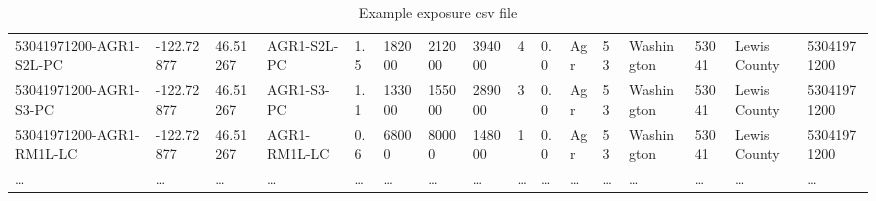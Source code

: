 \begin{table}[htbp]
{\begin{tabular}{llllllllllllllll}
53041971200-AGR1-S2L-PC  & -122.72877   & 46.51267     & AGR1-S2L-PC       & 1.5             & 182000              & 212000                 & 394000            & 4             & 0.0            & Agr                & 53                 & Washington     & 53041               & Lewis County    & 53041971200    \\
53041971200-AGR1-S3-PC   & -122.72877   & 46.51267     & AGR1-S3-PC        & 1.1             & 133000              & 155000                 & 289000            & 3             & 0.0            & Agr                & 53                 & Washington     & 53041               & Lewis County    & 53041971200    \\
53041971200-AGR1-RM1L-LC & -122.72877   & 46.51267     & AGR1-RM1L-LC      & 0.6             & 68000               & 80000                  & 148000            & 1             & 0.0            & Agr                & 53                 & Washington     & 53041               & Lewis County    & 53041971200    \\ \hline
\dots & \dots & \dots & \dots & \dots & \dots & \dots & \dots & \dots & \dots & \dots & \dots & \dots & \dots & \dots & \dots \\
\hline

\end{tabular}
}
\caption{Example exposure csv file}
\label{input:exposure_csv_wa}
\end{table}

